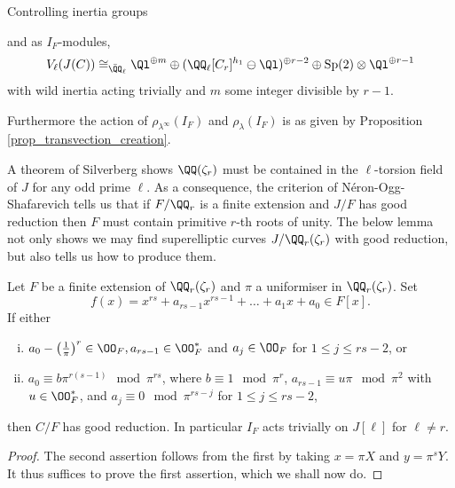 \documentclass[11pt,a4paper]{article}
\newcommand{\Qr}{{\QQ(\zeta_r)}}
\newcommand{\zr}{\zeta_r}
\begin{document}
\begin{section}{Controlling inertia groups}
\begin{example}
\begin{center}
\end{center}
and as $I_F$-modules, \[V_\ell(J(C)) \cong_{\Bar{\QQ}_\ell}\Ql^{\oplus m} \oplus (\QQ_\ell[C_{r}]^{h_1}  \ominus \Ql)^{\oplus r-2} \oplus \mathrm{Sp}(2) \otimes \Ql^{\oplus r-1}\]
with wild inertia acting trivially and $m$ some integer divisible by $r-1$. 

Furthermore the action of $\rho_{\lambda^\infty}(I_F)$ and $\rho_{\lambda}(I_F)$ is as given by Proposition \ref{prop_transvection_creation}.
\end{example}



A theorem of Silverberg \cite[Thm 4.1]{Silverberg} shows $\Qr$ must be contained in the $\ell$-torsion field of $J$ for any odd prime $\ell$. As a consequence, the criterion of N\'eron-Ogg-Shafarevich tells us that if $F/\QQ_r$ is a finite extension and $J/F$ has good reduction then $F$ must contain primitive $r$-th roots of unity.
The below lemma not only shows we may find superelliptic curves $J/\QQ_r(\zr)$ with good reduction, but also tells us how to produce them.

\begin{lemma}
\label{lemma_good_reduction_at_r}
Let $F$ be a finite extension of $\QQ_r(\zeta_r)$ and $\pi$ a uniformiser in $\QQ_r(\zeta_r)$. Set  $$f(x) = x^{rs} +a_{rs-1}x^{rs-1}+ \ldots + a_1x+a_0 \in F[x].$$
If either
\begin{enumerate}[(i)]
    \item $a_0 - \left(\frac{1}{\pi}\right)^r \in \OO_F, a_{rs-1} \in \OO^*_F$ and $a_j \in \OO_F$ for $1\leq j \leq rs-2 $, or
    \item $a_0\equiv b \pi^{r(s-1)} \mod{\pi^{rs}}$, where $b \equiv 1 \mod{\pi^r}$, $a_{rs-1} \equiv u\pi\mod{\pi^2}$ with $u \in \OO_F^*$, and $a_{j} \equiv 0\mod{\pi^{rs-j}} $ for $1\leq j \leq rs-2 $,
\end{enumerate}
then $C/F$ has good reduction. In particular $I_F$ acts trivially on $J[\ell]$ for $\ell \neq r$.
\end{lemma}

\begin{proof}
The second assertion follows from the first by taking $x = \pi X$ and $y = \pi^s Y$.
It thus suffices to prove the first assertion, which we shall now do.


\end{proof}
\end{section}
\end{document}
